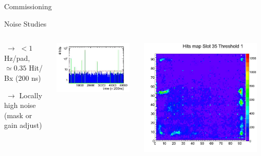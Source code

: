\documentclass[10pt]{beamer}
\begin{document}
\begin{frame}{Commissioning}
\begin{block}{Noise Studies}
\begin{columns}
\begin{column}{0.3\textwidth}
  {\small
    \par $ ~ \rightarrow$  $ < 1 $ Hz/pad, $\simeq 0.35 $ Hit/ Bx (200 ns)
    \par $ ~ \rightarrow$ Locally high noise (mask or gain adjust)
  }  
\end{column}
\begin{column}{0.35\textwidth}
  \centerline{\includegraphics[width=0.95\textwidth]{jpg/hitsperclock.jpg}}
\end{column}
\begin{column}{0.35\textwidth}
  \centerline{\includegraphics[width=0.95\textwidth]{jpg/HitsMap.jpg}}
\end{column}
\end{columns}
\end{block}


\end{frame}
\end{document}
